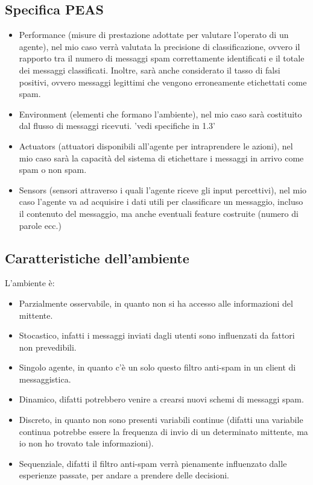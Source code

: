 \documentclass[]{article}
\begin{document}
    \subsection{Specifica PEAS}
        \begin{itemize}
            \item Performance (misure di prestazione adottate per valutare l’operato di un agente), nel mio caso verrà valutata la precisione di classificazione, ovvero il rapporto tra il numero di messaggi spam correttamente identificati e il totale dei messaggi classificati. Inoltre, sarà anche considerato il tasso di falsi positivi, ovvero messaggi legittimi che vengono erroneamente etichettati come spam.
            \item Environment (elementi che formano l’ambiente), nel mio caso sarà costituito dal flusso di messaggi ricevuti. 'vedi specifiche in 1.3'
            \item Actuators (attuatori disponibili all’agente per intraprendere le azioni), nel mio caso sarà la capacità del sistema di etichettare i messaggi in arrivo come spam o non spam.
            \item Sensors (sensori attraverso i quali l'agente riceve gli input percettivi), nel mio caso l'agente va ad acquisire i dati utili per classificare un messaggio, incluso il contenuto del messaggio, ma anche eventuali feature costruite (numero di parole ecc.)
        \end{itemize}

        \subsection{Caratteristiche dell'ambiente}
            L'ambiente è:
            \begin{itemize}
                \item Parzialmente osservabile, in quanto non si ha accesso alle informazioni del mittente.
                \item Stocastico, infatti i messaggi inviati dagli utenti sono influenzati da fattori non prevedibili.
                \item Singolo agente, in quanto c'è un solo questo filtro anti-spam in un client di messaggistica.
                \item Dinamico, difatti potrebbero venire a crearsi nuovi schemi di messaggi spam.
                \item Discreto, in quanto non sono presenti variabili continue (difatti una variabile continua potrebbe essere la frequenza di invio di un determinato mittente, ma io non ho trovato tale informazioni).
                \item Sequenziale, difatti il filtro anti-spam verrà pienamente influenzato dalle esperienze passate, per andare a prendere delle decisioni.
            \end{itemize}
\end{document}
